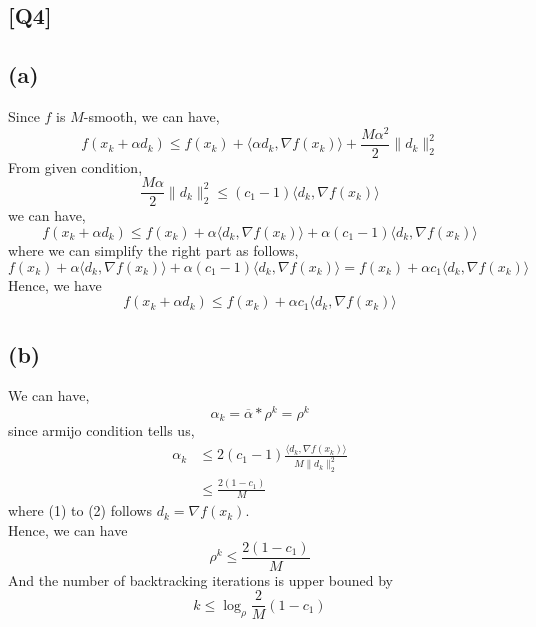 \documentclass[12pt, a4 paper]{article}
\begin{document}
    \begin{framed}
        \section{[Q4]}
        \subsection{(a)}
        Since $f$ is $M$-smooth, we can have,
        $$
        f(x_{k} + \alpha d_{k}) \leq f(x_{k}) + \langle \alpha d_{k},
        \nabla f(x_{k}) \rangle + \frac{M \alpha^{2}}{2} \lVert
        d_{k} \rVert_{2}^{2}
        $$
        \indent From given condition,
        $$
        \frac{M\alpha}{2} \lVert d_{k} \rVert_{2}^{2} \leq (c_{1}-1)
        \langle d_{k}, \nabla f(x_{k}) \rangle
        $$
        \indent we can have,
        $$
        f(x_{k}+\alpha d_{k}) \leq f(x_{k}) + \alpha \langle 
        d_{k}, \nabla f(x_{k})\rangle + \alpha(c_{1}-1) \langle 
        d_{k}, \nabla f(x_{k})\rangle
        $$
        \indent where we can simplify the right part as follows,
        $$
        f(x_{k}) + \alpha \langle 
        d_{k}, \nabla f(x_{k})\rangle + \alpha(c_{1}-1) \langle 
        d_{k}, \nabla f(x_{k})\rangle = f(x_{k}) + \alpha c_{1}
        \langle d_{k}, \nabla f(x_{k}) \rangle
        $$
        \indent Hence, we have
        $$
        f(x_{k}+\alpha d_{k}) \leq f(x_{k}) + \alpha c_{1}
        \langle d_{k}, \nabla f(x_{k}) \rangle
        $$

        \subsection{(b)}
        We can have,
        $$
            \alpha_{k} = \overline{\alpha} * \rho^{k} = \rho^{k}
        $$
        \indent since armijo condition tells us,
        \begin{align}
            \alpha_{k} &\leq 2(c_{1}-1)\frac{\langle d_{k},\nabla 
            f(x_{k}) \rangle}{M \lVert d_{k} \rVert_{2}^{2}} \\
            &\leq \frac{2(1-c_{1})}{M}
        \end{align}
        \indent where (1) to (2) follows $d_{k} = \nabla f(x_{k})$.\\
        \indent Hence, we can have
        $$
        \rho^{k} \leq \frac{2(1-c_{1})}{M}
        $$
        \indent And the number of backtracking iterations is 
        upper bouned by
        $$
        k \leq \log_{\rho}\frac{2}{M}(1-c_{1})
        $$
    \end{framed}
\end{document}
